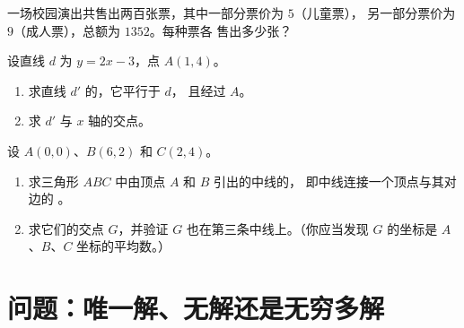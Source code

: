 \begin{exercise}[$\star\star$]\label{exo:g10:lines:8}
一场校园演出共售出两百张票，其中一部分票价为 $5$（儿童票），
另一部分票价为 $9$（成人票），总额为 $1352$。每种票各
售出多少张？
\end{exercise}

\begin{exercise}[$\star\star$]\label{exo:g10:lines:9}
设直线 $d$ 为 $y = 2x - 3$，点 $A(1, 4)$。
\begin{enumerate}
  \item 求直线 $d'$ 的，它平行于 $d$，
        且经过 $A$。
  \item 求 $d'$ 与 $x$ 轴的交点。
\end{enumerate}
\end{exercise}

\begin{exercise}[$\star\star\star$]\label{exo:g10:lines:10}
设 $A(0, 0)$、$B(6, 2)$ 和 $C(2, 4)$。
\begin{enumerate}
  \item 求三角形 $ABC$ 中由顶点 $A$ 和 $B$ 引出的中线的，
        即中线连接一个顶点与其对边的
        。
  \item 求它们的交点 $G$，并验证
        $G$ 也在第三条中线上。（你应当发现
        $G$ 的坐标是 $A$、$B$、$C$ 坐标的平均数。）
\end{enumerate}
\end{exercise}

\section{问题：唯一解、无解还是无穷多解}

